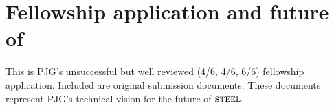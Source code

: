 
\chapter{Fellowship application and future of \steel}
\label{Appx:HF}

This is PJG's unsuccessful but well reviewed (4/6, 4/6, 6/6) fellowship application. Included are original submission documents. These documents represent PJG's technical vision for the future of $\textsc{steel}$.



